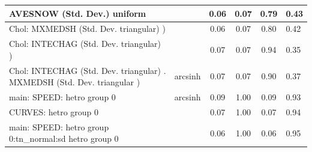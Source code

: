 \begin{table}
\begin{center}
\begin{tabular}{|l|l|c|c|c|l|}
			\hline
			AVESNOW (Std. Dev.) uniform &  & 0.06 & 0.07 & 0.79 & 0.43 \\
			\hline
			 Chol: MXMEDSH (Std. Dev. triangular) ) &  & 0.06 & 0.07 & 0.80 & 0.42 \\
			\hline
			 Chol: INTECHAG (Std. Dev. triangular) ) &  & 0.07 & 0.07 & 0.94 & 0.35 \\
			\hline
			 Chol: INTECHAG (Std. Dev. triangular) . MXMEDSH (Std. Dev.   triangular ) & arcsinh & 0.07 & 0.07 & 0.90 & 0.37 \\
			\hline
			main: SPEED: hetro group 0 & arcsinh & 0.09 & 1.00 & 0.09 & 0.93 \\
			\hline
			CURVES: hetro group 0 &  & 0.07 & 1.00 & 0.07 & 0.94 \\
			\hline
			main: SPEED: hetro group 0:tn_normal:sd  hetro group 0 &  & 0.06 & 1.00 & 0.06 & 0.95 \\
			\hline
		\end{tabular}
	\end{center}
\end{table}